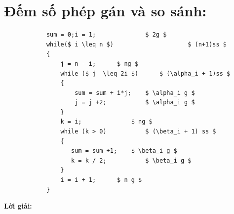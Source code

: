\documentclass[12pt, letterpaper]{article}
\begin{document}
\section{Đếm số phép gán và so sánh:}
\begin{lstlisting}
            sum = 0;i = 1;              $ 2g $
            while($ i \leq n $)                     $ (n+1)ss $ 
            {    
                j = n - i;		$ ng $
                while ($ j  \leq 2i $)		$ (\alpha_i + 1)ss $
                {
                    sum = sum + i*j;    $ \alpha_i g $
                    j = j +2;           $ \alpha_i g $		
                }
                k = i;             	$ ng $
                while (k > 0)	        $ (\beta_i + 1) ss $
                {
                   sum = sum +1;	$ \beta_i g $
                   k = k / 2;	        $ \beta_i g $
                }
                i = i + 1;		$ n g $
            }
	\end{lstlisting}
\textbf{Lời giải:}
\vspace{\baselineskip}
\end{document}
